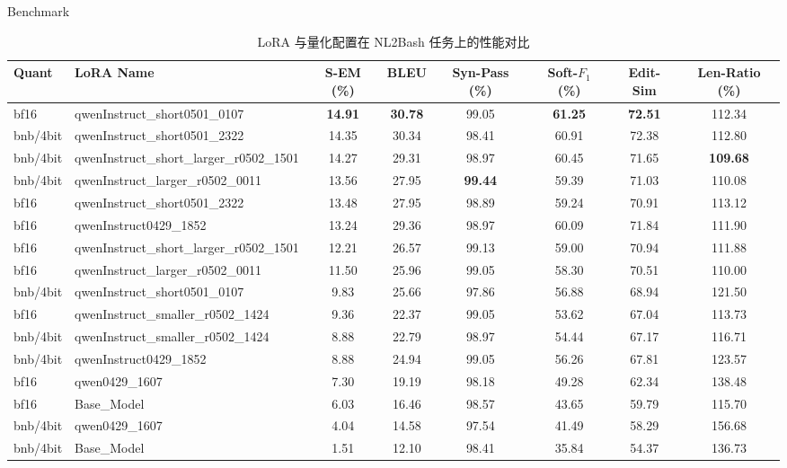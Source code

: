 \documentclass[aspectratio=169]{beamer}
\begin{document}
\begin{frame}{Benchmark}
    \begin{table}[h]
        \centering
        \caption{LoRA 与量化配置在 NL2Bash 任务上的性能对比}
        \begin{adjustbox}{max width=\textwidth, max height=0.72\textheight} 
        \scriptsize 
        \begin{tabular}{llcccccc}
            \toprule
            \textbf{Quant} & \textbf{LoRA Name} & \textbf{S-EM (\%)} & \textbf{BLEU} & \textbf{Syn-Pass (\%)} & \textbf{Soft-$F_1$ (\%)} & \textbf{Edit-Sim} & \textbf{Len-Ratio (\%)} \\
            \midrule
            bf16 & qwenInstruct\_short0501\_0107  & \textbf{14.91} & \textbf{30.78} & 99.05 & \textbf{61.25} & \textbf{72.51} & 112.34 \\
            bnb/4bit & qwenInstruct\_short0501\_2322  & 14.35 & 30.34 & 98.41 & 60.91 & 72.38 & 112.80 \\
            bnb/4bit & qwenInstruct\_short\_larger\_r0502\_1501  & 14.27 & 29.31 & 98.97 & 60.45 & 71.65 & \textbf{109.68} \\
            bnb/4bit & qwenInstruct\_larger\_r0502\_0011  & 13.56 & 27.95 & \textbf{99.44} & 59.39 & 71.03 & 110.08 \\
            bf16 & qwenInstruct\_short0501\_2322  & 13.48 & 27.95 & 98.89 & 59.24 & 70.91 & 113.12 \\
            bf16 & qwenInstruct0429\_1852  & 13.24 & 29.36 & 98.97 & 60.09 & 71.84 & 111.90 \\
            bf16 & qwenInstruct\_short\_larger\_r0502\_1501  & 12.21 & 26.57 & 99.13 & 59.00 & 70.94 & 111.88 \\
            bf16 & qwenInstruct\_larger\_r0502\_0011  & 11.50 & 25.96 & 99.05 & 58.30 & 70.51 & 110.00 \\
            bnb/4bit & qwenInstruct\_short0501\_0107  & 9.83 & 25.66 & 97.86 & 56.88 & 68.94 & 121.50 \\
            bf16 & qwenInstruct\_smaller\_r0502\_1424  & 9.36 & 22.37 & 99.05 & 53.62 & 67.04 & 113.73 \\
            bnb/4bit & qwenInstruct\_smaller\_r0502\_1424  & 8.88 & 22.79 & 98.97 & 54.44 & 67.17 & 116.71 \\
            bnb/4bit & qwenInstruct0429\_1852  & 8.88 & 24.94 & 99.05 & 56.26 & 67.81 & 123.57 \\
            bf16 & qwen0429\_1607  & 7.30 & 19.19 & 98.18 & 49.28 & 62.34 & 138.48 \\
            bf16 & Base\_Model  & 6.03 & 16.46 & 98.57 & 43.65 & 59.79 & 115.70 \\
            bnb/4bit & qwen0429\_1607  & 4.04 & 14.58 & 97.54 & 41.49 & 58.29 & 156.68 \\
            bnb/4bit & Base\_Model  & 1.51 & 12.10 & 98.41 & 35.84 & 54.37 & 136.73 \\
            \bottomrule
        \end{tabular}
        \end{adjustbox}
    \end{table}
\end{frame}
\end{document}
